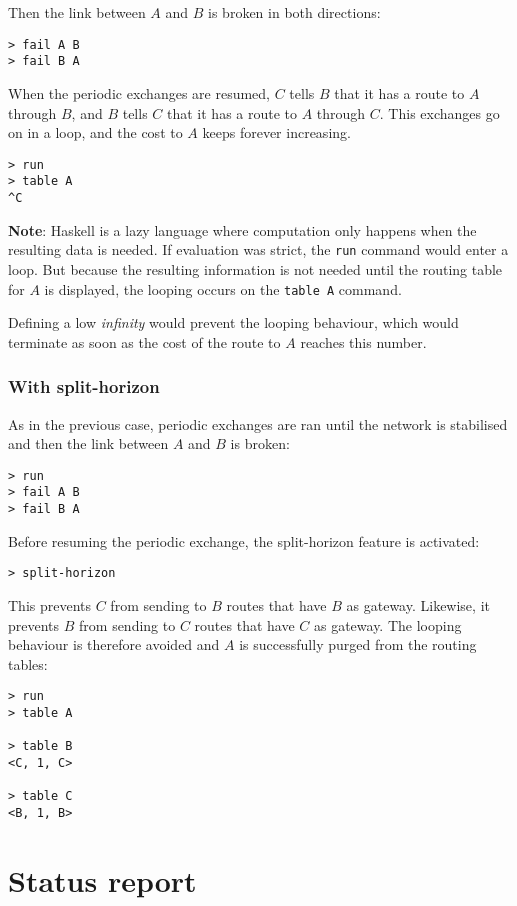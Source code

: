 \documentclass{scrartcl}
\begin{document}
Then the link between $A$ and $B$ is broken in both directions:

\begin{verbatim}
> fail A B
> fail B A
\end{verbatim}

When the periodic exchanges are resumed, $C$ tells $B$ that it has a route to
$A$ through $B$, and $B$ tells $C$ that it has a route to $A$ through $C$. This
exchanges go on in a loop, and the cost to $A$ keeps forever increasing.

\begin{verbatim}
> run
> table A
^C
\end{verbatim}

\textbf{Note}: Haskell is a lazy language where computation only happens when
the resulting data is needed. If evaluation was strict, the \texttt{run} command
would enter a loop. But because the resulting information is not needed until
the routing table for $A$ is displayed, the looping occurs on the \texttt{table
A} command.

Defining a low \textit{infinity} would prevent the looping behaviour, which
would terminate as soon as the cost of the route to $A$ reaches this number.

\subsubsection{With split-horizon}

As in the previous case, periodic exchanges are ran until the network is
stabilised and then the link between $A$ and $B$ is broken:

\begin{verbatim}
> run
> fail A B
> fail B A
\end{verbatim}

Before resuming the periodic exchange, the split-horizon feature is activated:

\begin{verbatim}
> split-horizon
\end{verbatim}

This prevents $C$ from sending to $B$ routes that have $B$ as gateway.
Likewise, it prevents $B$ from sending to $C$ routes that have $C$ as gateway.
The looping behaviour is therefore avoided and $A$ is successfully purged from
the routing tables:

\begin{verbatim}
> run
> table A

> table B
<C, 1, C>

> table C
<B, 1, B>
\end{verbatim}

\section{Status report}
\end{document}
